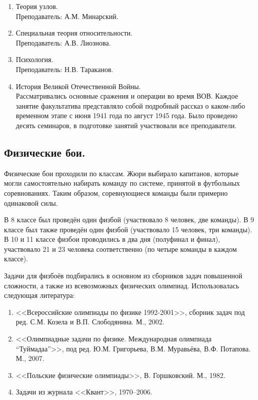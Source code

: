 \documentclass[12pt,a4paper,oneside]{scrartcl}
\begin{document}
\begin{enumerate}
\item Теория узлов. \\ \textsf{Преподаватель: А.М. Минарский}. 
\item Специальная теория относительности. \\ \textsf{Преподаватель: А.В. Лиознова}. 
\item Психология. \\ \textsf{Преподаватель: Н.В. Тараканов}. 
\item История Великой Отечественной Войны. \\

  Рассматривались основные сражения и операции во время ВОВ. Каждое
  занятие факультатива представляло собой подробный рассказ о
  каком-либо временном этапе с июня 1941 года по август 1945
  года. Было проведено десять семинаров, в подготовке занятий
  участвовали все преподаватели.
\end{enumerate}

\subsection{Физические бои.}
\label{sec:battles}

Физические бои проходили по классам. Жюри выбирало капитанов, которые
могли самостоятельно набирать команду по системе, принятой в
футбольных соревнованиях. Таким образом, соревнующиеся команды были
примерно одинаковой силы.

В 8 классе был проведён один физбой (участвовало 8 человек, две
команды). В 9 классе был также проведён один физбой (участвовало 15
человек, три команды). В 10 и 11 классе физбои проводились в два дня
(полуфинал и финал), участвовало 21 и 23 человека соответственно
(по четыре команды в каждом классе). 

Задачи для физбоёв подбирались в основном из сборников задач повышенной
сложности, а также из всевозможных физических олимпиад. Использовалась
следующая литература: 

\begin{enumerate}
\item <<Всероссийские олимпиады по физике 1992-2001>>, сборник задач
  под ред. С.М. Козела и В.П. Слободянина. М., 2002.
\item <<Олимпиадные задачи по физике. Международная олимпиада
  ``Туймадаа''>>, под ред. Ю.М. Григорьева, В.М. Муравьёва,
  В.Ф. Потапова. М., 2007.
\item <<Польские физические олимпиады>>, В. Горшковский. М., 1982.
\item Задачи из журнала <<Квант>>, 1970--2006. 
\end{enumerate}
\end{document}
